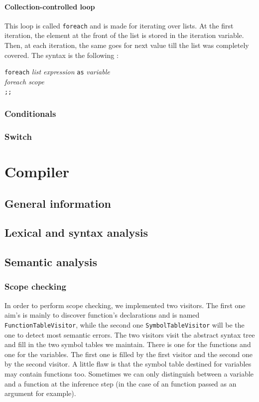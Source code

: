 \documentclass[a4paper,11pt]{article}
\begin{document}
\paragraph{Collection-controlled loop} This loop is called \texttt{foreach} and is made for iterating over lists. At the first iteration, the element at the front of the list is stored in the iteration variable. Then, at each iteration, the same goes for next value till the list was completely covered. The syntax is the following :
\begin{center}
	\begin{minipage}{0.35\linewidth}
		\texttt{foreach} \textit{list expression} \texttt{as} \textit{variable} \\
				\text{ }\text{ }\text{ }\text{ }\textit{foreach scope}\\
		\texttt{;;}\\
	\end{minipage}
\end{center}
\subsubsection{Conditionals}
\subsubsection{Switch}
\section{Compiler}
\label{sec:compiler}
\subsection{General information}
\subsection{Lexical and syntax analysis}
\subsection{Semantic analysis}
\subsubsection{Scope checking}
In order to perform scope checking, we implemented two visitors. The first one aim's is mainly to discover function's declarations and is named \texttt{FunctionTableVisitor}, while the second one \texttt{SymbolTableVisitor} will be the one to detect most semantic errors. The two visitors visit the abstract syntax tree and fill in the two symbol tables we maintain. There is one for the functions and one for the variables. The first one is filled by the first visitor and the second one by the second visitor. A little flaw is that the symbol table destined for variables may contain functions too. Sometimes we can only distinguish between a variable and a function at the inference step (in the case of an function passed as an argument for example).
\end{document}
